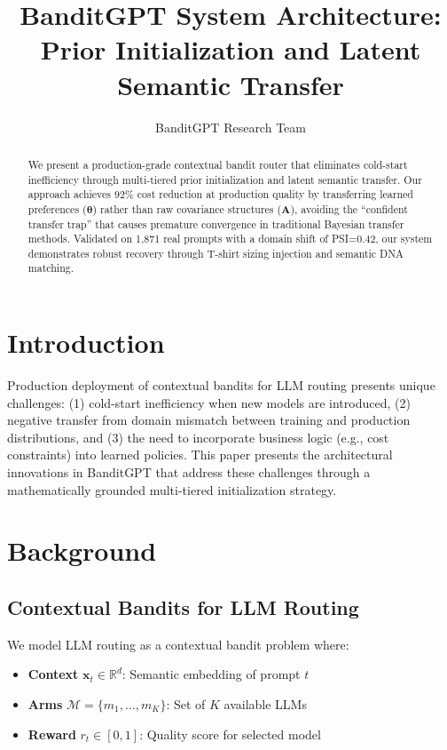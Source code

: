 \documentclass[sigconf]{acmart}
\begin{document}
\title{BanditGPT System Architecture: \\
Prior Initialization and Latent Semantic Transfer}

\author{BanditGPT Research Team}

\begin{abstract}
We present a production-grade contextual bandit router that eliminates cold-start inefficiency through multi-tiered prior initialization and latent semantic transfer. Our approach achieves 92\% cost reduction at production quality by transferring learned preferences ($\boldsymbol{\theta}$) rather than raw covariance structures ($\mathbf{A}$), avoiding the ``confident transfer trap'' that causes premature convergence in traditional Bayesian transfer methods. Validated on 1,871 real prompts with a domain shift of PSI=0.42, our system demonstrates robust recovery through T-shirt sizing injection and semantic DNA matching.
\end{abstract}

\maketitle

\section{Introduction}

Production deployment of contextual bandits for LLM routing presents unique challenges: (1) cold-start inefficiency when new models are introduced, (2) negative transfer from domain mismatch between training and production distributions, and (3) the need to incorporate business logic (e.g., cost constraints) into learned policies. This paper presents the architectural innovations in BanditGPT that address these challenges through a mathematically grounded multi-tiered initialization strategy.

\section{Background}

\subsection{Contextual Bandits for LLM Routing}

We model LLM routing as a contextual bandit problem where:
\begin{itemize}
    \item \textbf{Context} $\mathbf{x}_t \in \mathbb{R}^d$: Semantic embedding of prompt $t$
    \item \textbf{Arms} $\mathcal{M} = \{m_1, \ldots, m_K\}$: Set of $K$ available LLMs
    \item \textbf{Reward} $r_t \in [0, 1]$: Quality score for selected model
\end{itemize}
\end{document}
